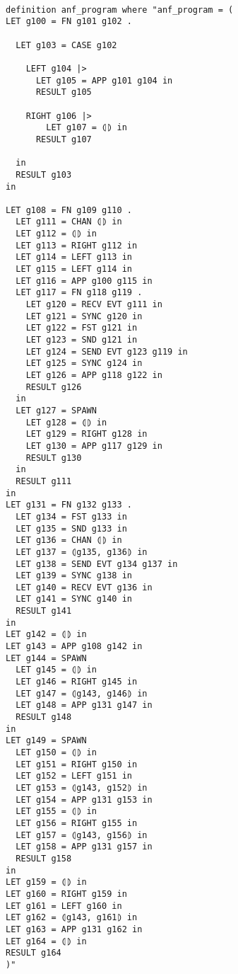 \documentclass{article}
\begin{document}
\begin{lstlisting}[style=codestyle1, escapechar=\%]

definition anf_program where "anf_program = (
LET g100 = FN g101 g102 . 

  LET g103 = CASE g102 

    LEFT g104 |> 
      LET g105 = APP g101 g104 in 
      RESULT g105 

    RIGHT g106 |> 
        LET g107 = ⦇⦈ in 
      RESULT g107 

  in 
  RESULT g103 
in 

LET g108 = FN g109 g110 . 
  LET g111 = CHAN ⦇⦈ in 
  LET g112 = ⦇⦈ in 
  LET g113 = RIGHT g112 in 
  LET g114 = LEFT g113 in 
  LET g115 = LEFT g114 in 
  LET g116 = APP g100 g115 in 
  LET g117 = FN g118 g119 . 
    LET g120 = RECV EVT g111 in 
    LET g121 = SYNC g120 in 
    LET g122 = FST g121 in 
    LET g123 = SND g121 in 
    LET g124 = SEND EVT g123 g119 in 
    LET g125 = SYNC g124 in 
    LET g126 = APP g118 g122 in 
    RESULT g126 
  in 
  LET g127 = SPAWN 
    LET g128 = ⦇⦈ in 
    LET g129 = RIGHT g128 in 
    LET g130 = APP g117 g129 in 
    RESULT g130 
  in 
  RESULT g111 
in 
LET g131 = FN g132 g133 . 
  LET g134 = FST g133 in 
  LET g135 = SND g133 in 
  LET g136 = CHAN ⦇⦈ in 
  LET g137 = ⦇g135, g136⦈ in 
  LET g138 = SEND EVT g134 g137 in 
  LET g139 = SYNC g138 in 
  LET g140 = RECV EVT g136 in 
  LET g141 = SYNC g140 in 
  RESULT g141 
in 
LET g142 = ⦇⦈ in 
LET g143 = APP g108 g142 in 
LET g144 = SPAWN 
  LET g145 = ⦇⦈ in 
  LET g146 = RIGHT g145 in
  LET g147 = ⦇g143, g146⦈ in
  LET g148 = APP g131 g147 in
  RESULT g148 
in
LET g149 = SPAWN 
  LET g150 = ⦇⦈ in
  LET g151 = RIGHT g150 in
  LET g152 = LEFT g151 in
  LET g153 = ⦇g143, g152⦈ in
  LET g154 = APP g131 g153 in
  LET g155 = ⦇⦈ in
  LET g156 = RIGHT g155 in
  LET g157 = ⦇g143, g156⦈ in
  LET g158 = APP g131 g157 in
  RESULT g158 
in
LET g159 = ⦇⦈ in
LET g160 = RIGHT g159 in
LET g161 = LEFT g160 in
LET g162 = ⦇g143, g161⦈ in
LET g163 = APP g131 g162 in
LET g164 = ⦇⦈ in
RESULT g164
)"


  \end{lstlisting}
\end{document}
